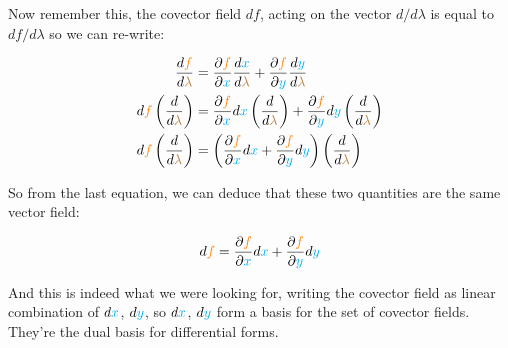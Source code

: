 Now remember this, the covector field $df$, acting on the vector $d/d\lambda$ is equal to $df/d\lambda$ so we can re-write:

\begin{align*}
    \frac{d\begingroup\color{orange}f\endgroup}{d \begingroup\color{brown}\lambda\endgroup} &=
    \frac{\partial \begingroup\color{orange}f\endgroup}{\partial \begingroup\color{cyan}x\endgroup} \frac{d \begingroup\color{cyan}x\endgroup}{d \begingroup\color{brown}\lambda\endgroup} +
    \frac{\partial \begingroup\color{orange}f\endgroup}{\partial \begingroup\color{cyan}y\endgroup} \frac{d \begingroup\color{cyan}y\endgroup}{d \begingroup\color{brown}\lambda\endgroup}\\
    d\begingroup\color{orange}f\endgroup \left(\frac{d}{d \begingroup\color{brown}\lambda\endgroup}\right) &=
    \frac{\partial \begingroup\color{orange}f\endgroup}{\partial \begingroup\color{cyan}x\endgroup} d\begingroup\color{cyan}x\endgroup \left(\frac{d }{d \begingroup\color{brown}\lambda\endgroup}\right) +
    \frac{\partial \begingroup\color{orange}f\endgroup}{\partial \begingroup\color{cyan}y\endgroup} d\begingroup\color{cyan}y\endgroup \left(\frac{d }{d \begingroup\color{brown}\lambda\endgroup}\right)\\
    d\begingroup\color{orange}f\endgroup \left(\frac{d}{d \begingroup\color{brown}\lambda\endgroup}\right) &=
    \left(\frac{\partial \begingroup\color{orange}f\endgroup}{\partial \begingroup\color{cyan}x\endgroup} d\begingroup\color{cyan}x\endgroup + \frac{\partial \begingroup\color{orange}f\endgroup}{\partial \begingroup\color{cyan}y\endgroup} d\begingroup\color{cyan}y\endgroup\right)
    \left(\frac{d}{d \begingroup\color{brown}\lambda\endgroup}\right)
\end{align*}

So from the last equation, we can deduce that these two quantities are the same vector field:

\begin{equation}
    d\begingroup\color{orange}f\endgroup = \frac{\partial \begingroup\color{orange}f\endgroup}{\partial \begingroup\color{cyan}x\endgroup} d\begingroup\color{cyan}x\endgroup + \frac{\partial \begingroup\color{orange}f\endgroup}{\partial \begingroup\color{cyan}y\endgroup} d\begingroup\color{cyan}y\endgroup
\end{equation}

And this is indeed what we were looking for, writing the covector field as linear combination of $d\color{cyan}x$, $d\color{cyan}y$, so $d\color{cyan}x$, $d\color{cyan}y$ form a basis for 
the set of covector fields. They're the dual basis for differential forms.\\

